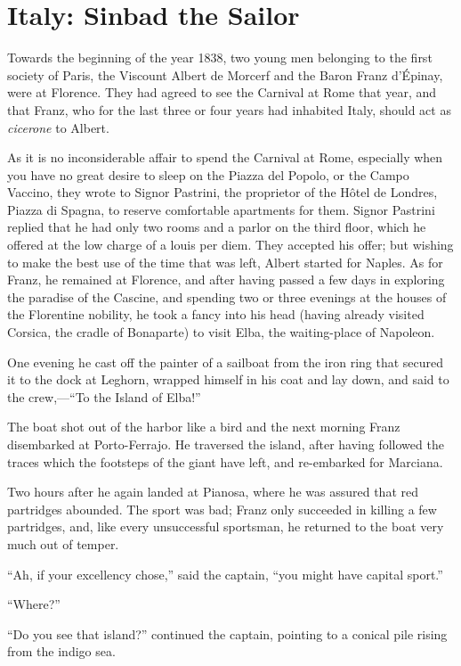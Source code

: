 \chapter{Italy: Sinbad the Sailor}

Towards the beginning of the year 1838, two young men belonging to the
first society of Paris, the Viscount Albert de Morcerf and the Baron
Franz d’Épinay, were at Florence. They had agreed to see the Carnival
at Rome that year, and that Franz, who for the last three or four years
had inhabited Italy, should act as \textit{cicerone} to Albert.

As it is no inconsiderable affair to spend the Carnival at Rome,
especially when you have no great desire to sleep on the Piazza del
Popolo, or the Campo Vaccino, they wrote to Signor Pastrini, the
proprietor of the Hôtel de Londres, Piazza di Spagna, to reserve
comfortable apartments for them. Signor Pastrini replied that he had
only two rooms and a parlor on the third floor, which he offered at the
low charge of a louis per diem. They accepted his offer; but wishing to
make the best use of the time that was left, Albert started for Naples.
As for Franz, he remained at Florence, and after having passed a few
days in exploring the paradise of the Cascine, and spending two or
three evenings at the houses of the Florentine nobility, he took a
fancy into his head (having already visited Corsica, the cradle of
Bonaparte) to visit Elba, the waiting-place of Napoleon.

One evening he cast off the painter of a sailboat from the iron ring
that secured it to the dock at Leghorn, wrapped himself in his coat and
lay down, and said to the crew,—“To the Island of Elba!”

The boat shot out of the harbor like a bird and the next morning Franz
disembarked at Porto-Ferrajo. He traversed the island, after having
followed the traces which the footsteps of the giant have left, and
re-embarked for Marciana.

Two hours after he again landed at Pianosa, where he was assured that
red partridges abounded. The sport was bad; Franz only succeeded in
killing a few partridges, and, like every unsuccessful sportsman, he
returned to the boat very much out of temper.

“Ah, if your excellency chose,” said the captain, “you might have
capital sport.”

“Where?”

“Do you see that island?” continued the captain, pointing to a conical
pile rising from the indigo sea.

